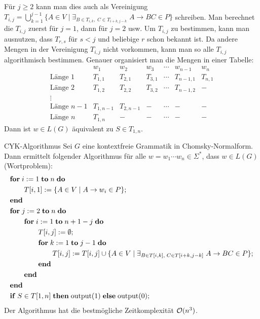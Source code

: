 \begin{Bem}
    Für $j \ge 2$ kann man dies auch als Vereinigung\\
    $T_{i,j} = \bigcup_{k=1}^{j-1} \{A \in V \;|\;
    \exists_{B \in T_{i,k},\; C \in T_{i+k,j-k}}\; A \rightarrow BC \in P\}$
    schreiben.
    Man berechnet die $T_{i,j}$ zuerst für $j = 1$, dann für $j = 2$ usw.
    Um $T_{i,j}$ zu bestimmen, kann man ausnutzen, dass $T_{r,s}$ für
    $s < j$ und beliebige $r$ schon bekannt ist.
    Da andere Mengen in der Vereinigung $T_{i,j}$ nicht vorkommen, kann man
    so alle $T_{i,j}$ algorithmisch bestimmen.
    Genauer organisiert man die Mengen in einer Tabelle:
    \[\begin{array}{r|c|c|ccc|c}
        & w_1 & w_2 & w_3 & \cdots & w_{n-1} & w_n \\\hline
        \text{Länge } 1 & T_{1,1} & T_{2,1} & T_{3,1} & \cdots &
        T_{n-1,1} & T_{n,1} \\\hline
        \text{Länge } 2 & T_{1,2} & T_{2,2} & T_{3,2} & \cdots &
        T_{n-1,2} & - \\\hline
        \vdots \\\hline
        \text{Länge } n - 1 & T_{1,n-1} & T_{2,n-1} & - & \cdots & - &
        - \\\hline
        \text{Länge } n & T_{1,n} & - & - & \cdots & - & -
    \end{array}\]
    Dann ist $w \in L(G)$ äquivalent zu $S \in T_{1,n}$.
\end{Bem}

\linie
\pagebreak

\begin{Satz}{CYK-Algorithmus}
    Sei $G$ eine kontextfreie Grammatik in Chomsky-Normalform.
    Dann ermittelt folgender Algorithmus für alle
    $w = w_1 \dotsb w_n \in \Sigma^\ast$, dass $w \in L(G)$
    (Wortproblem):
    \begin{align*}
        &\mathbf{for}\; i := 1 \;\mathbf{to}\; n \;\mathbf{do}\;\\
        &\qquad T[i, 1] := \{A \in V \;|\; A \rightarrow w_i \in P\};\\
        &\mathbf{end}\;\\
        &\mathbf{for}\; j := 2 \;\mathbf{to}\; n \;\mathbf{do}\;\\
        &\qquad\mathbf{for}\; i := 1 \;\mathbf{to}\; n + 1 - j \;\mathbf{do}\;\\
        &\qquad\qquad T[i, j] := \emptyset;\\
        &\qquad\qquad\mathbf{for}\; k := 1 \;\mathbf{to}\; j - 1 \;\mathbf{do}\;\\
        &\qquad\qquad\qquad T[i, j] := T[i, j] \cup \{A \in V \;|\;
            \exists_{B \in T[i, k],\; C \in T[i + k, j - k]}\;
            A \rightarrow BC \in P\};\\
        &\qquad\qquad\mathbf{end}\;\\
        &\qquad\mathbf{end}\;\\
        &\mathbf{end}\;\\
        &\mathbf{if}\; S \in T[1, n] \;\mathbf{then}\;
        \text{output}(1) \;\mathbf{else}\;
        \text{output}(0);
    \end{align*}
    Der Algorithmus hat die bestmögliche Zeitkomplexität $\mathcal{O}(n^3)$.
\end{Satz}

